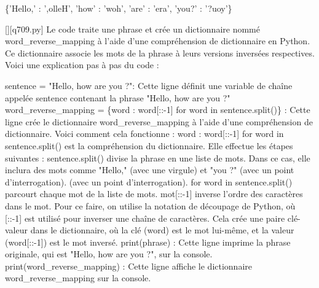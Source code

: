 \{'Hello,' : ',olleH', 'how' : 'woh', 'are' : 'era', 'you?' : '?uoy'\}
        \par
        \begin{solution}
            \renewcommand{\nomfichier}{q709.py}
            \pythonfile{\chemincode \nomfichier}[][\nomfichier]
            Le code traite une phrase et crée un dictionnaire nommé word\_reverse\_mapping à l'aide d'une compréhension de dictionnaire en Python. Ce dictionnaire associe les mots de la phrase à leurs versions inversées respectives. Voici une explication pas à pas du code :

    sentence = "Hello, how are you ?": Cette ligne définit une variable de chaîne appelée sentence contenant la phrase "Hello, how are you ?"
    word\_reverse\_mapping = \{word : word[::-1] for word in sentence.split()\} : Cette ligne crée le dictionnaire word\_reverse\_mapping à l'aide d'une compréhension de dictionnaire. Voici comment cela fonctionne :
        {word : word[::-1] for word in sentence.split()} est la compréhension du dictionnaire. Elle effectue les étapes suivantes :
        sentence.split() divise la phrase en une liste de mots. Dans ce cas, elle inclura des mots comme "Hello," (avec une virgule) et "you ?" (avec un point d'interrogation). (avec un point d'interrogation).
        for word in sentence.split() parcourt chaque mot de la liste de mots.
        mot[::-1] inverse l'ordre des caractères dans le mot. Pour ce faire, on utilise la notation de découpage de Python, où [::-1] est utilisé pour inverser une chaîne de caractères.
        Cela crée une paire clé-valeur dans le dictionnaire, où la clé (word) est le mot lui-même, et la valeur (word[::-1]) est le mot inversé.
    print(phrase) : Cette ligne imprime la phrase originale, qui est "Hello, how are you ?", sur la console.
    print(word\_reverse\_mapping) : Cette ligne affiche le dictionnaire word\_reverse\_mapping sur la console.
        \end{solution}
        

